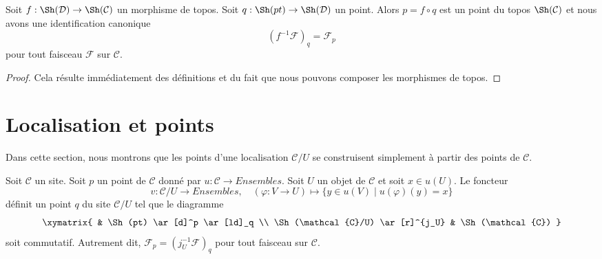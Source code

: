 \begin{lemma}
\label{lemma-point-morphism-topoi}
Soit $f : \Sh(\mathcal{D}) \to \Sh(\mathcal{C})$
un morphisme de topos. Soit $q : \Sh(pt) \to \Sh(\mathcal{D})$
un point. Alors $p = f \circ q$ est un point du topos
$\Sh(\mathcal{C})$ et nous avons
une identification canonique
$$
(f^{-1}\mathcal{F})_q = \mathcal{F}_p
$$
pour tout faisceau $\mathcal{F}$ sur $\mathcal{C}$.
\end{lemma}

\begin{proof}
Cela résulte immédiatement des définitions et du fait que nous pouvons
composer les morphismes de topos.
\end{proof}





\section{Localisation et points}
\label{section-localize-points}

\noindent
Dans cette section, nous montrons que les points d’une localisation $\mathcal{C}/U$
se construisent simplement à partir des points de $\mathcal{C}$.

\begin{lemma}
\label{lemma-point-localize}
Soit $\mathcal{C}$ un site. Soit $p$ un point de $\mathcal{C}$ donné par
$u : \mathcal{C} \to \textit{Ensembles}$. Soit $U$ un objet de $\mathcal{C}$
et soit $x \in u(U)$. Le foncteur
$$
v : \mathcal{C}/U \longrightarrow \textit{Ensembles}, \quad
(\varphi : V \to U) \longmapsto \{y \in u(V) \mid u(\varphi)(y) = x\}
$$
définit un point $q$ du site $\mathcal{C}/U$ tel que le diagramme
$$
\xymatrix{
& \Sh(pt) \ar[d]^p \ar[ld]_q \\
\Sh(\mathcal{C}/U) \ar[r]^{j_U} &
\Sh(\mathcal{C})
}
$$
soit commutatif. Autrement dit,
$\mathcal{F}_p = (j_U^{-1}\mathcal{F})_q$ pour tout
faisceau sur $\mathcal{C}$.
\end{lemma}

